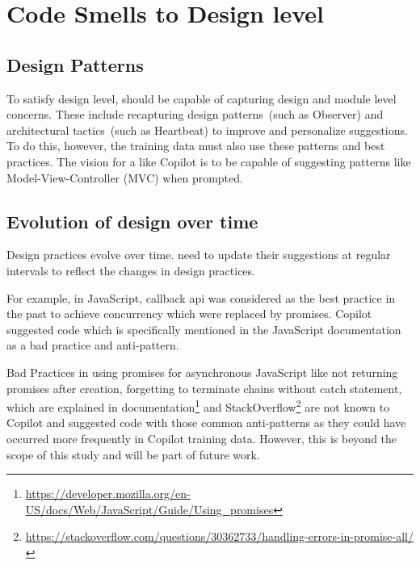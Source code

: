 \section{Code Smells to Design level}
\label{cs2design}


\subsection{Design Patterns}
\label{patterns}
To satisfy design level, \cct{} should be capable of capturing design and module level concerns. 
These include recapturing design patterns~(such as Observer) and architectural tactics~(such as Heartbeat) to improve and personalize suggestions.
To do this, however, the training data must also use these patterns and best practices.
The vision for a \cct{} like Copilot is to be capable of suggesting patterns like Model-View-Controller (MVC) when prompted.

\subsection{Evolution of design over time}
\label{evolution}
Design practices evolve over time. \cct{} need to update their suggestions at regular intervals to reflect the changes in design practices. 

For example, in JavaScript, callback api was considered as the best practice in the past to achieve concurrency which were replaced by promises. Copilot suggested code which is specifically mentioned in the JavaScript documentation as a bad practice and anti-pattern.

Bad Practices in using promises for asynchronous JavaScript like not returning promises after creation, forgetting to terminate chains without catch statement, which are explained in documentation\footnote{\label{docs}\url{https://developer.mozilla.org/en-US/docs/Web/JavaScript/Guide/Using_promises}} and StackOverflow\footnote{\url{https://stackoverflow.com/questions/30362733/handling-errors-in-promise-all/}} are not known to Copilot and suggested code with those common anti-patterns as they could have occurred more frequently in Copilot training data. However, this is beyond the scope of this study and will be part of future work.